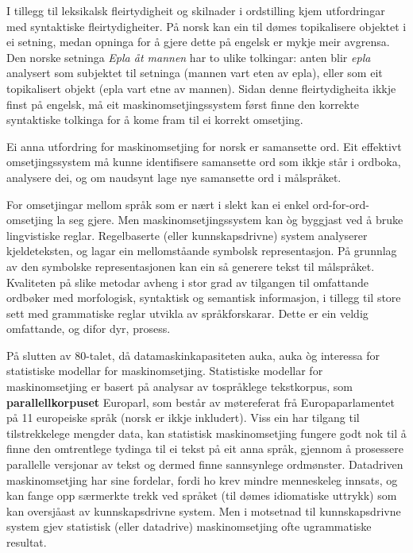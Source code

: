 \begin{multicols}{2}
I tillegg til leksikalsk fleirtydigheit og skilnader i ordstilling kjem utfordringar med syntaktiske fleirtydigheiter. På norsk kan ein til dømes topikalisere objektet i ei setning, medan opninga for å gjere dette på engelsk er mykje meir avgrensa. Den norske setninga \textit{Epla åt mannen} har to ulike tolkingar: anten blir \textit{epla} analysert som subjektet til setninga (mannen vart eten av epla), eller som eit topikalisert objekt (epla vart etne av mannen). Sidan denne fleirtydigheita ikkje finst på engelsk, må eit maskinomsetjingssystem først finne den korrekte syntaktiske tolkinga for å kome fram til ei korrekt omsetjing.

Ei anna utfordring for maskinomsetjing for norsk er samansette ord. Eit effektivt omsetjingssystem må kunne identifisere samansette ord som ikkje står i ordboka, analysere dei, og om naudsynt lage nye samansette ord i målspråket.

For omsetjingar mellom språk som er nært i slekt kan ei enkel ord-for-ord-omsetjing la seg gjere. Men maskinomsetjingssystem kan òg byggjast ved å bruke lingvistiske reglar. Regelbaserte (eller kunnskapsdrivne) system analyserer kjeldeteksten, og lagar ein mellomståande symbolsk representasjon. På grunnlag av den symbolske representasjonen kan ein så generere tekst til målspråket. Kvaliteten på slike metodar avheng i stor grad av tilgangen til omfattande ordbøker med morfologisk, syntaktisk og semantisk informasjon, i tillegg til store sett med grammatiske reglar utvikla av språkforskarar. Dette er ein veldig omfattande, og difor dyr, prosess.

På slutten av 80-talet, då datamaskinkapasiteten auka, auka òg interessa for statistiske modellar for maskinomsetjing. Statistiske modellar for maskinomsetjing er basert på analysar av tospråklege tekstkorpus, som \textbf{parallellkorpuset} Europarl, som består av møtereferat frå Europaparlamentet på 11 europeiske språk 
(norsk er ikkje inkludert).
Viss ein har tilgang til tilstrekkelege mengder data, kan statistisk maskinomsetjing fungere godt nok til å finne den omtrentlege tydinga til ei tekst på eit anna språk, gjennom å prosessere parallelle versjonar av tekst og dermed finne sannsynlege ordmønster. Datadriven maskinomsetjing har sine fordelar, fordi ho krev mindre menneskeleg innsats, og kan fange opp særmerkte trekk ved språket (til dømes idiomatiske uttrykk) som kan oversjåast av kunnskapsdrivne system. Men i motsetnad til kunnskapsdrivne system gjev statistisk (eller datadrive) maskinomsetjing ofte ugrammatiske resultat.  


\end{multicols}
